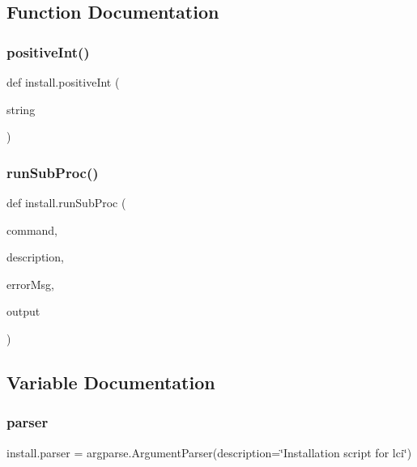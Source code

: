 \subsection{Function Documentation}
\mbox{\label{namespaceinstall_a322a65573b48799208f0c1465a283d07}} 
\subsubsection{\texorpdfstring{positive\+Int()}{positiveInt()}}
{\footnotesize\ttfamily def install.\+positive\+Int (\begin{DoxyParamCaption}\item[{}]{string }\end{DoxyParamCaption})}

\mbox{\label{namespaceinstall_ace4411f334d06fa0f3435c68f7f99d7b}} 
\subsubsection{\texorpdfstring{run\+Sub\+Proc()}{runSubProc()}}
{\footnotesize\ttfamily def install.\+run\+Sub\+Proc (\begin{DoxyParamCaption}\item[{}]{command,  }\item[{}]{description,  }\item[{}]{error\+Msg,  }\item[{}]{output }\end{DoxyParamCaption})}



\subsection{Variable Documentation}
\mbox{\label{namespaceinstall_abc452e1fa01635990639b0504ec27ae7}} 
\subsubsection{\texorpdfstring{parser}{parser}}
{\footnotesize\ttfamily install.\+parser = argparse.\+Argument\+Parser(description=\char`\"{}Installation script for lci\char`\"{})}

